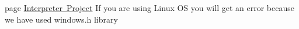 
\begin{DoxyRefList}
\item[page \mbox{\hyperlink{index}{Interpreter Project}} ]\label{bug__bug000001}%
%
If you are using Linux OS you will get an error because we have used windows.\+h library 
\end{DoxyRefList}